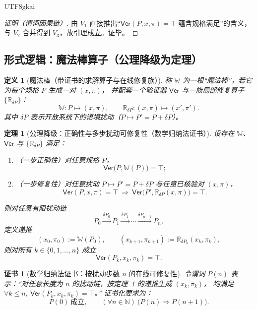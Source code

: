 \documentclass[12pt]{article}
\newtheorem{definition}{定义}[section]
\newtheorem{theorem}{定理}[section]
\newtheorem{Certificate}{证书}[section]
\newcommand{\NN}{\mathbb{N}}
\begin{document}
\begin{CJK*}{UTF8}{gkai}
\begin{proof}[证明（谓词因果链）]
由 $V_1$ 直接推出“$\mathsf{Ver}(P,x,\pi)=\top$ 蕴含规格满足”的含义，
与 $V_2$ 合并得到 $V_3$，故引理成立。证毕。
\end{proof}

\subsection{形式逻辑：魔法棒算子（公理降级为定理）}
\label{sec:magic-wand-operator}

\begin{definition}[魔法棒（带证书的求解算子与在线修复族）]
\label{def:magic-wand-operator}
称 $\mathbb{W}$ 为一根“魔法棒”，若它为每个规格 $P$ 生成一对 $(x,\pi)$，
并配套一个验证器 $\mathsf{Ver}$ 与一族局部修复算子 $\{\mathbb{R}_{\delta P}\}$：
\[
  \mathbb{W}: P \longmapsto (x,\pi),\qquad
  \mathbb{R}_{\delta P}:(x,\pi)\longmapsto (x',\pi').
\]
其中 $\delta P$ 表示开放系统下的语境扰动（$P\mapsto P'=P+\delta P$）。
\end{definition}

\begin{theorem}[公理降级：正确性与多步扰动可修复性（数学归纳法证书）]
\label{thm:magic-wand-axioms-downgrade}
设存在 $\mathbb{W}$、$\mathsf{Ver}$ 与 $\{\mathbb{R}_{\delta P}\}$ 满足：
\begin{enumerate}
  \item （一步正确性）对任意规格 $P$，
  \[
    \mathsf{Ver}\!\bigl(P,\mathbb{W}(P)\bigr)=\top;
  \]
  \item （一步修复性）对任意扰动 $P\mapsto P'=P+\delta P$ 与任意已核验对 $(x,\pi)$，
  \[
    \mathsf{Ver}(P,x,\pi)=\top
    \ \Longrightarrow\
    \mathsf{Ver}\!\bigl(P',\mathbb{R}_{\delta P}(x,\pi)\bigr)=\top.
  \]
\end{enumerate}
则对任意有限扰动链
\[
  P_0 \xrightarrow{\delta P_0} P_1 \xrightarrow{\delta P_1} \cdots \xrightarrow{\delta P_{n-1}} P_n,
\]
定义递推
\[
  (x_0,\pi_0):=\mathbb{W}(P_0),\qquad
  (x_{k+1},\pi_{k+1}):=\mathbb{R}_{\delta P_k}(x_k,\pi_k),
\]
则对所有 $k\in\{0,1,\dots,n\}$ 成立
\[
  \mathsf{Ver}(P_k,x_k,\pi_k)=\top.
\]
\end{theorem}

\begin{Certificate}[数学归纳法证书：按扰动步数 $n$ 的在线可修复性]
\label{cert:magic-wand-axioms-downgrade}
令谓词 $P(n)$ 表示：“对任意长度为 $n$ 的扰动链，按定理~\ref{thm:magic-wand-axioms-downgrade} 的递推生成 $(x_k,\pi_k)$，
均满足 $\forall k\le n,\ \mathsf{Ver}(P_k,x_k,\pi_k)=\top$。”
证书化要求为：
\[
  P(0)\ \text{成立},\qquad
  (\forall n\in\NN)\ \bigl(P(n)\Rightarrow P(n+1)\bigr).
\]
\end{Certificate}


\end{CJK*}
\end{document}
